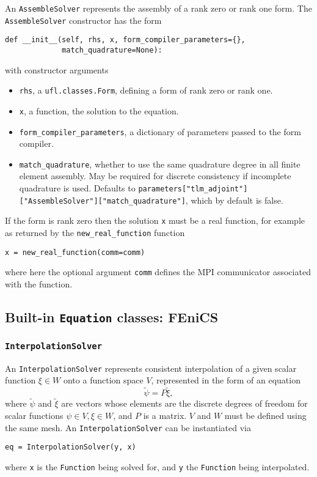 \documentclass[11pt]{article}
\begin{document}
An \texttt{AssembleSolver} represents the assembly of a rank zero or rank one
form. The \texttt{AssembleSolver} constructor has the form
\begin{lstlisting}
def __init__(self, rhs, x, form_compiler_parameters={},
             match_quadrature=None):
\end{lstlisting}
with constructor arguments
\begin{itemize}
  \item \texttt{rhs}, a \texttt{ufl.classes.Form}, defining a form of rank zero
    or rank one.
  \item \texttt{x}, a function, the solution to the equation.
  \item \texttt{form\_compiler\_parameters}, a dictionary of parameters passed
    to the form compiler.
  \item \texttt{match\_quadrature}, whether to use the same quadrature degree
    in all finite element assembly. May be required for discrete consistency if
    incomplete quadrature is used. Defaults to
    \texttt{parameters["tlm\_adjoint"]}\texttt{["AssembleSolver"]}\texttt{["match\_quadrature"]},
    which by default is false.
\end{itemize}

If the form is rank zero then the solution \texttt{x} must be a real function,
for example as returned by the \texttt{new\_real\_function} function
\begin{lstlisting}
x = new_real_function(comm=comm)
\end{lstlisting}
where here the optional argument \texttt{comm} defines the MPI communicator
associated with the function.

\subsection{Built-in \texttt{Equation} classes: FEniCS}

\subsubsection{\texttt{InterpolationSolver}}\label{sect:InterpolationSolver}

An \texttt{InterpolationSolver} represents consistent interpolation of a given
scalar function $\xi \in W$ onto a function space $V$, represented in the form
of an equation
\begin{equation*}
  \tilde{\psi} = P \tilde{\xi},
\end{equation*}
where $\tilde{\psi}$ and $\tilde{\xi}$ are vectors whose elements are the
discrete degrees of freedom for scalar functions $\psi \in V, \xi \in W$, and
$P$ is a matrix. $V$ and $W$ must be defined using the same mesh. An
\texttt{InterpolationSolver} can be instantiated via
\begin{lstlisting}
eq = InterpolationSolver(y, x)
\end{lstlisting}
where \texttt{x} is the \texttt{Function} being solved for, and \texttt{y} the
\texttt{Function} being interpolated.
\end{document}
